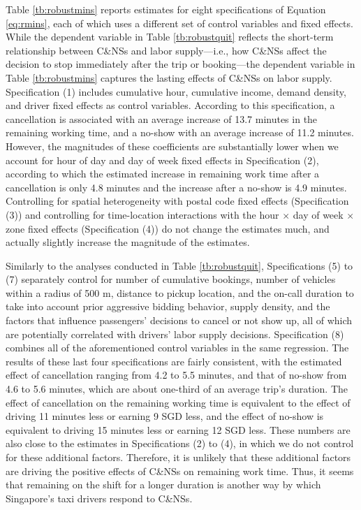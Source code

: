 \documentclass[reviewmode]{restud}
\begin{document}
Table \ref{tb:robustmins} reports estimates for eight specifications of Equation \eqref{eq:rmins}, each of which uses a different set of control variables and fixed effects. While the dependent variable in Table \ref{tb:robustquit} reflects the short-term relationship between C\&NSs and labor supply---i.e., how C\&NSs affect the decision to stop immediately after the trip or booking---the dependent variable in Table \ref{tb:robustmins} captures the lasting effects of C\&NSs on labor supply. Specification (1) includes cumulative hour, cumulative income, demand density, and driver fixed effects as control variables. According to this specification, a cancellation is associated with an average increase of 13.7 minutes in the remaining working time, and a no-show with an average increase of 11.2 minutes. However, the magnitudes of these coefficients are substantially lower when we account for hour of day and day of week fixed effects in Specification (2), according to which the estimated increase in remaining work time after a cancellation is only 4.8 minutes and the increase after a no-show is 4.9 minutes. Controlling for spatial heterogeneity with  postal code fixed effects (Specification (3)) and controlling for time-location interactions with the hour $\times$ day of week $\times$ zone fixed effects (Specification (4)) do not change the estimates much, and actually slightly increase the magnitude of the estimates. 

Similarly to the analyses conducted in Table \ref{tb:robustquit}, Specifications (5) to (7) separately control for number of cumulative bookings, number of vehicles within a radius of 500 m, distance to pickup location, and the on-call duration to take into account prior aggressive bidding behavior, supply density, and the factors that influence passengers' decisions to cancel or not show up, all of which are potentially correlated with drivers' labor supply decisions. Specification (8) combines all of the aforementioned control variables in the same regression. The results of these last four specifications are fairly consistent, with the estimated effect of cancellation ranging from 4.2 to 5.5 minutes, and that of no-show from 4.6 to 5.6 minutes, which are about one-third of an average trip's duration. The effect of cancellation on the remaining working time is equivalent to the effect of driving 11 minutes less or earning 9 SGD less, and the effect of no-show is equivalent to driving 15 minutes less or earning 12 SGD less. These numbers are also close to the estimates in Specifications (2) to (4), in which we do not control for these additional factors. Therefore, it is unlikely that these additional factors are driving the positive effects of C\&NSs on remaining work time. Thus, it seems that remaining on the shift for a longer duration is another way by which Singapore's taxi drivers respond to C\&NSs.
\end{document}
